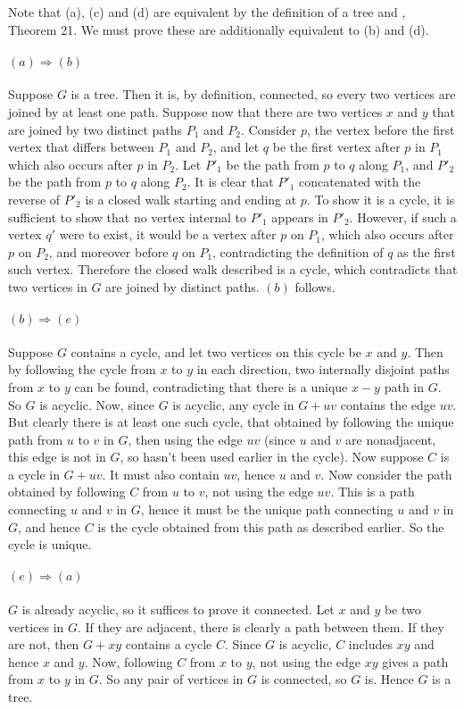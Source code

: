 Note that (a), (c) and (d) are equivalent by the definition of a tree and
\cite{notes}, Theorem 21. We must prove these are additionally equivalent
to (b) and (d).

\paragraph{$(a)\Rightarrow(b)$} Suppose $G$ is a tree. Then it is, by
definition, connected, so every two vertices are joined by at least one
path. Suppose now that there are two vertices $x$ and $y$ that are joined
by two distinct paths $P_1$ and $P_2$. Consider $p$, the vertex before the
first vertex that differs between $P_1$ and $P_2$, and let $q$ be the first
vertex after $p$ in $P_1$ which also occurs after $p$ in $P_2$. Let
$P'_1$ be the path from $p$ to $q$ along $P_1$, and $P'_2$ be the path from
$p$ to $q$ along $P_2$. It is clear that $P'_1$ concatenated with the
reverse of $P'_2$ is a closed walk starting and ending at $p$. To show it is
a cycle, it is sufficient to show that no vertex internal to $P'_1$ appears
in $P'_2$. However, if such a vertex $q'$ were to exist, it would be a
vertex after $p$ on $P_1$, which also occurs after $p$ on $P_2$, and
moreover before $q$ on $P_1$, contradicting the definition of $q$ as the
first such vertex. Therefore the closed walk described is a cycle, which
contradicts that two vertices in $G$ are joined by distinct paths. $(b)$
follows.

\paragraph{$(b)\Rightarrow(e)$} 
Suppose $G$ contains a cycle, and let two vertices on this cycle be $x$
and $y$. Then by following the cycle from $x$ to $y$ in each direction,
two internally disjoint paths from $x$ to $y$ can be found, contradicting
that there is a unique $x-y$ path in $G$. So $G$ is acyclic.
Now, since $G$ is acyclic, any
cycle in $G+uv$ contains the edge $uv$. But clearly there is at least one
such cycle, that obtained by following the unique path from $u$ to $v$ in
$G$, then using the edge $uv$ (since $u$ and $v$ are nonadjacent, this edge
is not in $G$, so hasn't been used earlier in the cycle). Now suppose $C$ is
a cycle in $G+uv$. It must also contain $uv$, hence $u$ and $v$. Now
consider the path obtained by following $C$ from $u$ to $v$, not using the
edge $uv$. This is a path connecting $u$ and $v$ in $G$, hence it must be
the unique path connecting $u$ and $v$ in $G$, and hence $C$ is the cycle
obtained from this path as described earlier. So the cycle is unique.

\paragraph{$(e)\Rightarrow(a)$} $G$ is already acyclic, so it suffices to
prove it connected. Let $x$ and $y$ be two vertices in $G$. If they are
adjacent, there is clearly a path between them. If they are not, then
$G+xy$ contains a cycle $C$. Since $G$ is acyclic, $C$ includes
$xy$ and hence $x$ and $y$. Now, following $C$ from $x$ to $y$, not using
the edge $xy$ gives a path from $x$ to $y$ in $G$. So any pair
of vertices in $G$ is connected, so $G$ is. Hence $G$ is a tree.
